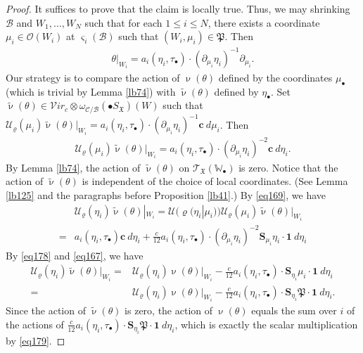 \documentclass[12pt,a4paper,notitlepage]{report}
\theoremstyle{definition}
\theoremstyle{plain}
\newcommand{\fk}{\mathfrak}
\newcommand{\mc}{\mathcal}
\newcommand{\wtd}{\widetilde}
\newcommand{\id}{\mathbf{1}}
\newcommand{\scr}{\mathscr}
\newcommand{\sgm}{\varsigma}
\newcommand{\blt}{\bullet}
\newcommand{\Wbb}{\mathbb W}
\newcommand{\cbf}{\mathbf c}
\newcommand{\svir}{\mathcal V\!\mathit{ir}}
\newcommand{\Sbf}{\mathbf{S}}
\numberwithin{equation}{section}
\begin{document}
\begin{proof}
It suffices to prove that the claim is locally true. Thus, we may shrinking $\mc B$ and $W_1,\dots,W_N$ such  that for each $1\leq i\leq N$, there exists a coordinate  $\mu_i\in\scr O(W_i)$ at $\sgm_i(\mc B)$ such that $(W_i,\mu_i)\in\fk P$. Then
\begin{align*}
\theta|_{W_i}=a_i(\eta_i,\tau_\blt)\cdot(\partial_{\mu_i}\eta_i)^{-1}\partial_{\mu_i}.
\end{align*}
Our strategy is to compare the action of $\upnu(\theta)$ defined by the coordinates $\mu_\blt$ (which is trivial by Lemma \ref{lb74}) with $\wtd \upnu(\theta)$ defined by $\eta_\blt$. Set $\wtd\upnu(\theta)\in \svir_c\otimes \omega_{\mc C/\mc B}(\blt S_{\fk X})(W)$ such that $\mc U_\varrho(\mu_i)\wtd\upnu(\theta)|_{W_i}=a_i(\eta_i,\tau_\blt)\cdot(\partial_{\mu_i}\eta_i)^{-1}\cbf~d{\mu_i}$. Then
\begin{align*}
\mc U_\varrho(\mu_i)\wtd\upnu(\theta)|_{W_i}=a_i(\eta_i,\tau_\blt)\cdot(\partial_{\mu_i}\eta_i)^{-2}\cbf~d{\eta_i}.
\end{align*}
By Lemma \ref{lb74}, the action of $\wtd\upnu(\theta)$ on $\scr T_{\fk X}(\Wbb_\blt)$ is zero. Notice that the action of $\wtd\upnu(\theta)$ is independent of the choice of local coordinates. (See Lemma \ref{lb125} and the paragraphs before Proposition \ref{lb41}.) By \eqref{eq169}, we have
\begin{align*}
&\mc U_\varrho(\eta_i)\wtd\upnu(\theta)|_{W_i}=\mc U(\varrho(\eta_i|\mu_i))\mc U_\varrho(\mu_i)\wtd\upnu(\theta)|_{W_i}\\
=&a_i(\eta_i,\tau_\blt)\cbf~d{\eta_i}+\frac{c}{12} a_i(\eta_i,\tau_\blt)\cdot(\partial_{\mu_i}\eta_i)^{-2}\Sbf_{\mu_i}\eta_i\cdot \id~d{\eta_i}
\end{align*}
By \eqref{eq178} and \eqref{eq167}, we have
\begin{align*}
\mc U_\varrho(\eta_i)\wtd\upnu(\theta)|_{W_i}=&\mc U_\varrho(\eta_i)\upnu(\theta)|_{W_i}-\frac{c}{12} a_i(\eta_i,\tau_\blt)\cdot\Sbf_{\eta_i}\mu_i\cdot \id~d{\eta_i}\\
=&\mc U_\varrho(\eta_i)\upnu(\theta)|_{W_i}-\frac{c}{12} a_i(\eta_i,\tau_\blt)\cdot\Sbf_{\eta_i}\fk P\cdot \id~d{\eta_i}.
\end{align*}
Since the action of $\wtd\upnu(\theta)$ is zero, the action of $\upnu(\theta)$ equals the sum over $i$ of the actions of $\frac{c}{12} a_i(\eta_i,\tau_\blt)\cdot\Sbf_{\eta_i}\fk P\cdot \id~d{\eta_i}$, which is exactly the scalar multiplication by \eqref{eq179}.
\end{proof}
\end{document}
